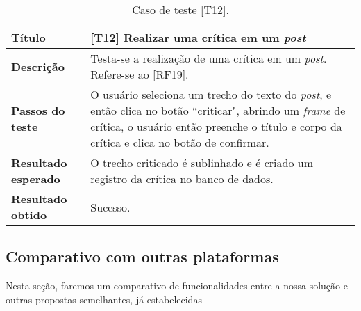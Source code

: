 \clearpage

\begin{table}[hbt!]
    \centering
    \begin{tabularx}{0.9\textwidth}{l|X}
    \hline
    \textbf {Título} & [T12] Realizar uma crítica em um \textit{post} \\\hline
    \textbf {Descrição} & Testa-se a realização de uma crítica em um \textit{post}. Refere-se ao [RF19]. \\ \hline
    \textbf {Passos do teste} & O usuário seleciona um trecho do texto do \textit{post}, e então clica no botão “criticar", abrindo um \textit{frame} de crítica, o usuário então preenche o título e corpo da crítica e clica no botão de confirmar. \\ \hline
    \textbf {Resultado esperado} & O trecho criticado é sublinhado e é criado um registro da crítica no banco de dados. \\ \hline
    \textbf {Resultado obtido} & Sucesso. \\ \hline
    \end{tabularx}
    \caption{Caso de teste [T12].}
\end{table}


\subsection{Comparativo com outras plataformas}
Nesta seção, faremos um comparativo de funcionalidades entre a nossa solução e outras propostas semelhantes, já estabelecidas

